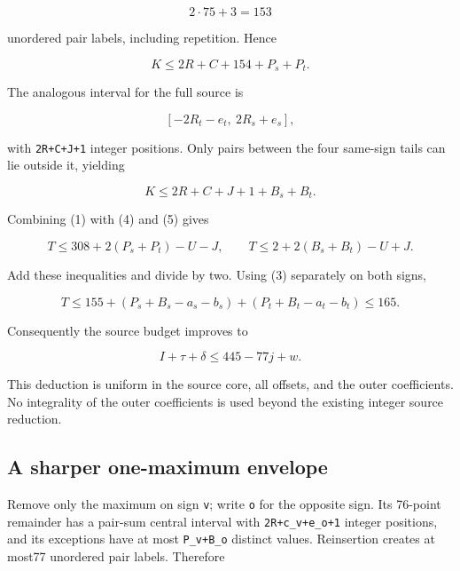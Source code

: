 \documentclass[10pt,a4paper]{article}
\theoremstyle{definition}
\begin{document}
\[
 2\cdot75+\allowbreak{}3=\allowbreak{}153
\]

unordered pair labels,\allowbreak{} including repetition. Hence

\[
 K\le2R+\allowbreak{}C+\allowbreak{}154+\allowbreak{}P_s+\allowbreak{}P_t.                               \tag{4}
\]

The analogous interval for the full source is

\[
 [-2R_t-e_t,\allowbreak{}\ 2R_s+\allowbreak{}e_s],\allowbreak{}
\]

with \texttt{2R+\allowbreak{}C+\allowbreak{}J+\allowbreak{}1} integer positions. Only pairs
between the four same-sign tails can lie outside it,\allowbreak{} yielding

\[
 K\le2R+\allowbreak{}C+\allowbreak{}J+\allowbreak{}1+\allowbreak{}B_s+\allowbreak{}B_t.                               \tag{5}
\]

Combining (1) with (4) and (5) gives

\[
 T\le308+\allowbreak{}2(P_s+\allowbreak{}P_t)-U-J,\allowbreak{}
 \qquad T\le2+\allowbreak{}2(B_s+\allowbreak{}B_t)-U+\allowbreak{}J.
\]

Add these inequalities and divide by two. Using (3) separately on both
signs,\allowbreak{}

\[
 T\le155+\allowbreak{}(P_s+\allowbreak{}B_s-a_s-b_s)+\allowbreak{}(P_t+\allowbreak{}B_t-a_t-b_t)
   \le\boxed{165}.                                  \tag{6}
\]

Consequently the source budget improves to

\[
               I+\allowbreak{}\tau+\allowbreak{}\delta\le445-77j+\allowbreak{}w.             \tag{7}
\]

This deduction is uniform in the source core,\allowbreak{} all offsets,\allowbreak{} and the outer
coefficients. No integrality of the outer coefficients is used beyond
the existing integer source reduction.

\hypertarget{a-sharper-one-maximum-envelope}{%
\subsection{A sharper one-maximum
envelope}\label{a-sharper-one-maximum-envelope}}

Remove only the maximum on sign \texttt{v}; write
\texttt{o} for the opposite sign. Its 76-point
remainder has a pair-sum central interval with
\texttt{2R+\allowbreak{}c\_\allowbreak{}\allowbreak{}v+\allowbreak{}e\_\allowbreak{}\allowbreak{}o+\allowbreak{}1} integer positions,\allowbreak{} and its
exceptions have at most \texttt{P\_\allowbreak{}\allowbreak{}v+\allowbreak{}B\_\allowbreak{}\allowbreak{}o} distinct
values. Reinsertion creates at most77 unordered pair labels. Therefore
\end{document}
